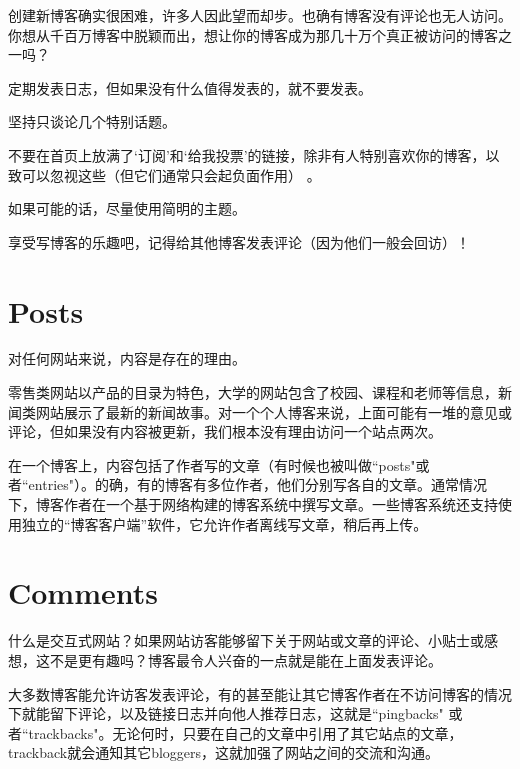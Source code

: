 创建新博客确实很困难，许多人因此望而却步。也确有博客没有评论也无人访问。你想从千百万博客中脱颖而出，想让你的博客成为那几十万个真正被访问的博客之一吗？

\begin{compactenum}
\item 定期发表日志，但如果没有什么值得发表的，就不要发表。
\item 坚持只谈论几个特别话题。
\item 不要在首页上放满了`订阅'和`给我投票'的链接，除非有人特别喜欢你的博客，以致可以忽视这些（但它们通常只会起负面作用） 。
\item 如果可能的话，尽量使用简明的主题。
\item 享受写博客的乐趣吧，记得给其他博客发表评论（因为他们一般会回访）！
\end{compactenum}

\section{Posts}

对任何网站来说，内容是存在的理由。

零售类网站以产品的目录为特色，大学的网站包含了校园、课程和老师等信息，新闻类网站展示了最新的新闻故事。对一个个人博客来说，上面可能有一堆的意见或评论，但如果没有内容被更新，我们根本没有理由访问一个站点两次。

在一个博客上，内容包括了作者写的文章（有时候也被叫做``posts"或者``entries"）。的确，有的博客有多位作者，他们分别写各自的文章。通常情况下，博客作者在一个基于网络构建的博客系统中撰写文章。一些博客系统还支持使用独立的“博客客户端”软件，它允许作者离线写文章，稍后再上传。

\section{Comments}



什么是交互式网站？如果网站访客能够留下关于网站或文章的评论、小贴士或感想，这不是更有趣吗？博客最令人兴奋的一点就是能在上面发表评论。

大多数博客能允许访客发表评论，有的甚至能让其它博客作者在不访问博客的情况下就能留下评论，以及链接日志并向他人推荐日志，这就是``pingbacks" 或者``trackbacks"。无论何时，只要在自己的文章中引用了其它站点的文章， trackback就会通知其它bloggers，这就加强了网站之间的交流和沟通。

